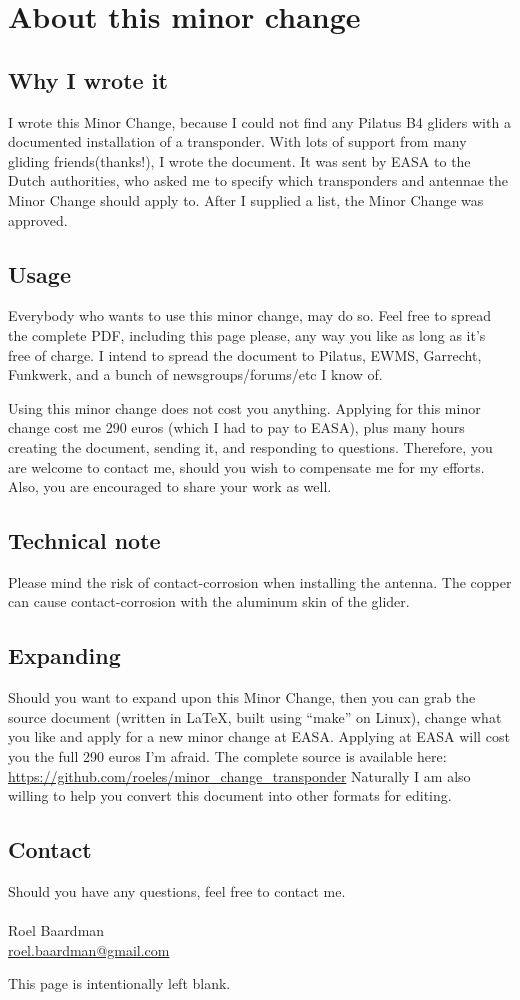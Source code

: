 \documentclass{article}
\begin{document}
\section{About this minor change}

\subsection{Why I wrote it}
I wrote this Minor Change, because I could not find any Pilatus B4 gliders with a documented installation of a transponder. With lots of support from many gliding friends(thanks!), I wrote the document. It was sent by EASA to the Dutch authorities, who asked me to specify which transponders and antennae the Minor Change should apply to. After I supplied a list, the Minor Change was approved.

\subsection{Usage}
Everybody who wants to use this minor change, may do so. Feel free to spread the complete PDF, including this page please, any way you like as long as it’s free of charge. I intend to spread the document to Pilatus, EWMS, Garrecht, Funkwerk, and a bunch of newsgroups/forums/etc I know of. 

Using this minor change does not cost you anything. Applying for this minor change cost me 290 euros (which I had to pay to EASA), plus many hours creating the document, sending it, and responding to questions. 
Therefore, you are welcome to contact me, should you wish to compensate me for my efforts. Also, you are encouraged to share your work as well.

\subsection{Technical note}
Please mind the risk of contact-corrosion when installing the antenna. The copper can cause contact-corrosion with the aluminum skin of the glider. 

\subsection{Expanding}
Should you want to expand upon this Minor Change, then you can grab the source document (written in LaTeX, built using “make” on Linux), change what you like and apply for a new minor change at EASA. Applying at EASA will cost you the full 290 euros I’m afraid.
The complete source is available here: \href{https://github.com/roeles/minor_change_transponder}{https://github.com/roeles/minor\_change\_transponder}
Naturally I am also willing to help you convert this document into other formats for editing.

\subsection{Contact}
Should you have any questions, feel free to contact me. \\
\\
Roel Baardman \\
\href{mailto:roel.baardman@gmail.com}{roel.baardman@gmail.com}

\newpage
This page is intentionally left blank.
\end{document}
